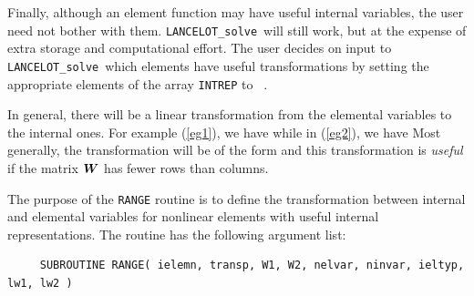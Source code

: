 \documentclass{galahad}
\newcommand{\fullpackagename}{LANC\-E\-LOT}
\newcommand{\solver}{{\tt \fullpackagename\_solve}}
\begin{document}
Finally, although an element function
may have  useful internal variables,   the user need  not  bother with
them. \solver\ will still work, but at the expense of extra storage
and computational effort.   The user decides  on input to \solver\
which elements have useful transformations
by setting the appropriate elements of the array {\tt INTREP}  to
\true\ .

In general, there will be a linear transformation from
the elemental variables to the internal ones. For example
(\ref{eg1}), we have
while in (\ref{eg2}), we have
Most generally, the transformation will be of the form
\disp{\bmu = \bmW \bmv,}
and this transformation is {\em useful} if the matrix ${\bm{W}}$ has
fewer rows than columns.

The purpose of the {\tt RANGE}
routine is to define the transformation
between internal and elemental variables for
nonlinear elements
with useful internal representations.
The routine has the following argument list:

\def\baselinestretch{0.8}
{\tt \begin{verbatim}
     SUBROUTINE RANGE( ielemn, transp, W1, W2, nelvar, ninvar, ieltyp, lw1, lw2 )
\end{verbatim} }
\def\baselinestretch{1.0}
\end{document}
